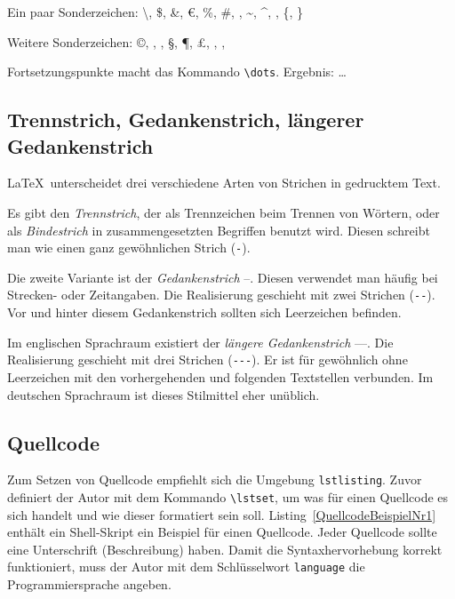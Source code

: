 \documentclass{llncs}
\begin{document}
Ein paar Sonderzeichen: \textbackslash, \$, \&, \euro, \%, \#, \textunderscore, \textasciitilde, \textasciicircum, \textbar, \{, \}

Weitere Sonderzeichen: \copyright, \textregistered, \texttrademark, \S, \P, \pounds, \dag, \ddag, \textbullet

Fortsetzungspunkte macht das Kommando \verb!\dots!. Ergebnis: \dots

\subsection{Trennstrich, Gedankenstrich, längerer Gedankenstrich}

\LaTeX\ unterscheidet drei verschiedene Arten von Strichen in gedrucktem Text.

Es gibt den \emph{Trennstrich}, der als Trennzeichen beim Trennen von Wörtern, oder als \emph{Bindestrich} in zusammengesetzten Begriffen benutzt wird. Diesen schreibt man wie einen ganz gewöhnlichen Strich (\verb!-!).

Die zweite Variante ist der \emph{Gedankenstrich} --. Diesen verwendet man häufig bei Strecken- oder Zeitangaben. Die Realisierung geschieht mit zwei Strichen (\verb!--!). Vor und hinter diesem Gedankenstrich sollten sich Leerzeichen befinden.

Im englischen Sprachraum existiert der \emph{längere
Gedankenstrich} ---. Die Realisierung geschieht mit drei Strichen (\verb!---!). Er ist für gewöhnlich ohne Leerzeichen mit den vorhergehenden und folgenden Textstellen verbunden. Im deutschen Sprachraum ist dieses Stilmittel eher unüblich.

\subsection{Quellcode}

Zum Setzen von Quellcode empfiehlt sich die Umgebung \verb!lstlisting!. Zuvor definiert der Autor mit dem Kommando \verb!\lstset!, um was für einen Quellcode es sich handelt und wie dieser formatiert sein soll. Listing~\ref{QuellcodeBeispielNr1} enthält ein Shell-Skript ein Beispiel für einen Quellcode. Jeder Quellcode sollte eine Unterschrift (Beschreibung) haben. Damit die Syntaxhervorhebung korrekt funktioniert, muss der Autor mit dem Schlüsselwort \verb!language! die Programmiersprache angeben. 
\end{document}
